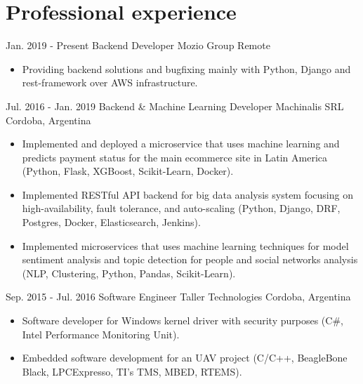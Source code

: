 
\section{Professional experience}

  \cventry
    {Jan. 2019 - Present} %
    {Backend Developer} %
    {Mozio Group} %
    {Remote} %
    {}
    {
      \begin{itemize} %
        \item {Providing backend solutions and bugfixing mainly with Python, Django and rest-framework over AWS infrastructure.}
      \end{itemize}
    }


  \cventry
    {Jul. 2016 - Jan. 2019} %
    {Backend \& Machine Learning Developer} %
    {Machinalis SRL} %
    {Cordoba, Argentina} %
    {}
    {
      \begin{itemize} %
        \item {Implemented and deployed a microservice that uses machine learning and predicts payment status for the main ecommerce site in Latin America (Python, Flask, XGBoost, Scikit-Learn, Docker).}
        \item {Implemented RESTful API backend for big data analysis system focusing on high-availability, fault tolerance, and auto-scaling (Python, Django, DRF, Postgres, Docker, Elasticsearch, Jenkins).}
        \item {Implemented microservices that uses machine learning techniques for model sentiment analysis and topic detection for people and social networks analysis (NLP, Clustering, Python, Pandas, Scikit-Learn).}
      \end{itemize}
    }

  \cventry
    {Sep. 2015 - Jul. 2016} %
    {Software Engineer} %
    {Taller Technologies} %
    {Cordoba, Argentina} %
    {}
    {
      \begin{itemize} %
        \item {Software developer for Windows kernel driver with security purposes (C\#, Intel Performance Monitoring Unit).}
        \item {Embedded software development for an UAV project (C/C++, BeagleBone Black, LPCExpresso, TI's TMS, MBED, RTEMS).}
      \end{itemize}
    }

